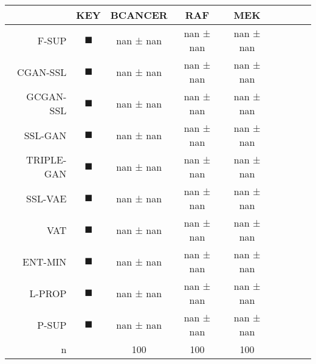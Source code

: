 \begin{tabular}{rcccccccc}
\toprule
 & KEY & BCANCER & RAF & MEK \\
\midrule
F-SUP & \textcolor{FULLY_SUPERVISED_CLASSIFIER}{\LARGE $\blacksquare$} & nan ± nan & nan ± nan & nan ± nan \\
CGAN-SSL & \textcolor{CGAN_BASIC_SUPERVISED_CLASSIFIER}{\LARGE $\blacksquare$} & nan ± nan & nan ± nan & nan ± nan \\
GCGAN-SSL & \textcolor{CGAN_GUMBEL_SUPERVISED_CLASSIFIER}{\LARGE $\blacksquare$} & nan ± nan & nan ± nan & nan ± nan \\
SSL-GAN & \textcolor{SSL_GAN}{\LARGE $\blacksquare$} & nan ± nan & nan ± nan & nan ± nan \\
TRIPLE-GAN & \textcolor{TRIPLE_GAN}{\LARGE $\blacksquare$} & nan ± nan & nan ± nan & nan ± nan \\
SSL-VAE & \textcolor{SSL_VAE}{\LARGE $\blacksquare$} & nan ± nan & nan ± nan & nan ± nan \\
VAT & \textcolor{VAT}{\LARGE $\blacksquare$} & nan ± nan & nan ± nan & nan ± nan \\
ENT-MIN & \textcolor{ENTROPY_MINIMISATION}{\LARGE $\blacksquare$} & nan ± nan & nan ± nan & nan ± nan \\
L-PROP & \textcolor{LABEL_PROPAGATION}{\LARGE $\blacksquare$} & nan ± nan & nan ± nan & nan ± nan \\
P-SUP & \textcolor{PARTIAL_SUPERVISED_CLASSIFIER}{\LARGE $\blacksquare$} & nan ± nan & nan ± nan & nan ± nan \\
n &  & 100 & 100 & 100 \\
\bottomrule
\end{tabular}
